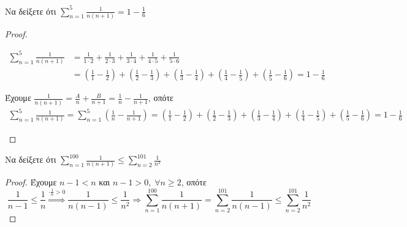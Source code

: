\documentclass[main.tex]{subfiles}
\begin{document}
\begin{example}
    Να δείξετε ότι $ \sum_{n=1}^{5} \frac{1}{n(n+1)} = 1 - \frac{1}{6}  $
\end{example}

\begin{proof}
\item {}
    \begin{description}
        \item [Α᾽ Τρόπος:]
            \begin{align*}
                \sum_{n=1}^{5} \frac{1}{n(n+1)} 
        &= \frac{1}{1\cdot 2} + \frac{1}{2 \cdot 3} + \frac{1}{3 \cdot 4} 
        + \frac{1}{4 \cdot 5} + \frac{1}{5 \cdot 6} \\
        &= \left(\frac{1}{1} - \frac{1}{2}\right) + \left(\frac{1}{2} 
        - \frac{1}{3} \right) + \left(\frac{1}{3} - \frac{1}{4}\right) 
        + \left(\frac{1}{4} - \frac{1}{5}\right) +
        \left(\frac{1}{5} - \frac{1}{6}\right)  = 1 - \frac{1}{6}
            \end{align*}

        \item [Β᾽ Τρόπος: (Με ανάλυση σε Απλά Κλάσματα)]
        \item {}
            Έχουμε $ \frac{1}{n(n+1)} = \frac{A}{n} + \frac{B}{n+1} = 
            \frac{1}{n} - \frac{1}{n+1}$, οπότε
            \begin{align*}
                \sum_{n=1}^{5} \frac{1}{n(n+1)} = \sum_{n=1}^{5} \left(\frac{1}{n} - 
                \frac{1}{n+1}\right)    
                = \left(\frac{1}{1} - \frac{1}{2}\right) + \left(\frac{1}{2} 
                - \frac{1}{3} \right) + \left(\frac{1}{3} - \frac{1}{4}\right) 
                + \left(\frac{1}{4} - \frac{1}{5}\right) +
                \left(\frac{1}{5} - \frac{1}{6}\right)  = 1 - \frac{1}{6}
            \end{align*} 
    \end{description}
    
\end{proof}


\begin{example}
    Να δείξετε ότι $ \sum_{n=1}^{100} \frac{1}{n(n+1)} \leq \sum_{n=2}^{101} 
    \frac{1}{n^{2}} $
\end{example}
\begin{proof}
\item {} 
    Έχουμε $ n-1 < n $ και $ n-1 > 0, \; \forall n \geq 2 $, οπότε
    \[
        \frac{1}{n-1} \leq \frac{1}{n} \overset{\cdot \frac{1}{n} >0}{\Rightarrow}
        \frac{1}{n(n-1)} \leq \frac{1}{n^{2}} \Rightarrow \sum_{n=1}^{100} 
        \frac{1}{n(n+1)} = \sum_{n=2}^{101} \frac{1}{n(n-1)} \leq \sum_{n=2}^{101} 
        \frac{1}{n^{2}} 
    \] 
\end{proof}
\end{document}
